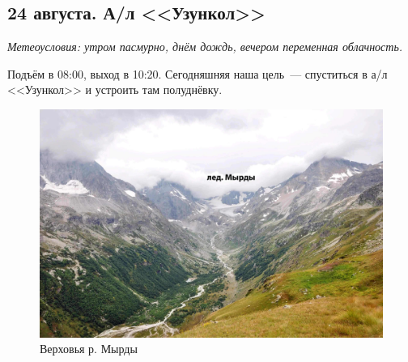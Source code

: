 \subsection{24 августа. А/л <<Узункол>>}
\textit{Метеоусловия: утром пасмурно, днём дождь, вечером переменная облачность.}

Подъём в 08:00, выход в 10:20. Сегодняшняя наша цель~--- спуститься в а/л <<Узункол>> и устроить там полуднёвку.


\begin{figure}[h!]
	\centering
	\includegraphics[width=0.7\linewidth]{../pics/DSC_0107.jpg}
	\caption{Верховья р. Мырды}
	\label{fig:DSC_0107.jpg}
\end{figure}


\newpage